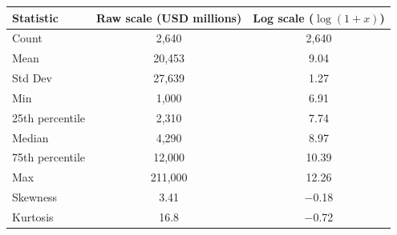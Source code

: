 \begin{tabular}{lcc}
\toprule
Statistic & Raw scale (USD millions) & Log scale ($\log(1+x)$) \\
\midrule
Count & 2{,}640 & 2{,}640 \\
Mean & 20{,}453 & 9.04 \\
Std Dev & 27{,}639 & 1.27 \\
Min & 1{,}000 & 6.91 \\
25th percentile & 2{,}310 & 7.74 \\
Median & 4{,}290 & 8.97 \\
75th percentile & 12{,}000 & 10.39 \\
Max & 211{,}000 & 12.26 \\
Skewness & 3.41 & $-$0.18 \\
Kurtosis & 16.8 & $-$0.72 \\
\bottomrule
\end{tabular}